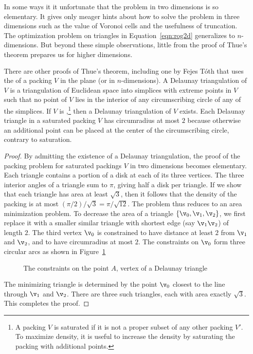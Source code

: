 In some ways it it unfortunate that the problem in two dimensions is
so elementary.  It gives only meager hints about how to solve the problem
in three dimensions such as the value of Voronoi cells
and the usefulness of truncation.  The optimization problem on
triangles in Equation~\ref{eqn:rog2d} generalizes to $n$-dimensions.
But beyond these simple observations,  little from the proof of Thue's
theorem prepares us for higher dimensions.


\bigskip

There are other proofs of Thue's theorem, including one by Fejes
T\'oth that uses the  of a packing $V$
in the plane (or in $n$-dimensions).  A Delaunay triangulation of $V$
is a triangulation of Euclidean space into simplices with extreme
points in $V$ such that no point of $V$ lies in the interior of any
circumscribing circle of any of the simplices.  If $V$ is
,\footnote{A packing $V$ is saturated if it is not
  a proper subset of any other packing $V'$.  To maximize density, it
  is useful to increase the density by saturating the packing with
  additional points.} then a Delaunay triangulation of
$V$ exists.  Each Delaunay triangle in a saturated packing $V$ has
circumradius at most $2$ because otherwise an additional point can be
placed at the center of the circumscribing circle, contrary to saturation.

\begin{proof}
  By admitting the existence of a Delaunay triangulation, the proof of
  the packing problem for saturated packings $V$ in two dimensions becomes
  elementary.  Each triangle contains a portion of a disk at each of
  its three vertices.  The three interior angles of a triangle sum to
  $\pi$, giving half a disk per triangle.  If we show that each triangle has area
  at least $\sqrt{3}$, then it follows that the density of the packing is at most
  $(\pi/2)/\sqrt{3} = \pi/\sqrt{12}$.  The problem thus reduces to
  an area minimization problem.  To decrease the area of a triangle
  $\{\v_0,\v_1,\v_2\}$, we first replace it with a smaller similar
  triangle with shortest edge (say $\v_1\v_2$) of length $2$.  The
  third vertex $\v_0$ is constrained to have distance at least $2$
  from $\v_1$ and $\v_2$, and to have circumradius at most $2$.  The
  constraints on $\v_0$ form three circular arcs as shown in
  Figure~\ref{fig:2D-FT} %

\begin{figure}[htb]
  \centering
  \caption{The constraints on the point $A$, vertex of a Delaunay triangle}
  \label{fig:2D-FT}
\end{figure}

The minimizing triangle is determined by the point $\v_0$ closest to
the line through $\v_1$ and $\v_2$.  There are three such triangles,
each with area exactly $\sqrt3$.  This completes the proof.
\end{proof}

